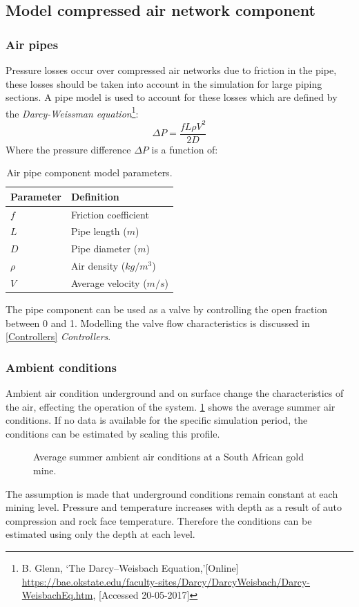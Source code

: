 	\subsection{Model compressed air network component}
		\subsubsection{Air pipes}
		Pressure losses occur over compressed air networks due to friction in the pipe, these losses should be taken into account in the simulation for large piping sections. A pipe model is used to account for these losses which are defined by the \textit{Darcy-Weissman equation}\footnote{ B. Glenn, \enquote*{The Darcy–Weisbach Equation,}[Online] \url{https://bae.okstate.edu/faculty-sites/Darcy/DarcyWeisbach/Darcy-WeisbachEq.htm}, [Accessed 20-05-2017]}:
		$$\Delta P = \frac{f  L \rho V^2}{2 D}$$
		Where the pressure difference $\Delta P $ is a function of:\\
		\begin{table}[h]
			\centering
			\begin{tabular}{ll}
				\hline
				Parameter & Definition\\
				\hline
				$f$ & Friction coefficient  \\
				$L$ & Pipe length ($m$) \\
				$D$ & Pipe diameter ($m$) \\
				$\rho$ & Air density ($kg/m^3$)\\	
				$V$ & Average velocity ($m/s$) \\	
				\hline
			\end{tabular} 
		\caption{Air pipe component model parameters.}
		\label{table: Darcy-Weisbach}
		\end{table}
		
		The pipe component can be used as a valve by controlling the open fraction between 0 and 1. Modelling the valve flow characteristics is discussed in \cref{Controllers} \textit{Controllers}.
		\subsubsection{Ambient conditions}
		Ambient air condition underground and on surface change the characteristics of the air, effecting the operation of the system. \cref{fig: Ambient} shows the average summer air conditions. If no data is available for the specific simulation period, the conditions can be estimated by scaling this profile. 
		\begin{figure}[h]
			\centering
			\fbox{}
			\caption{Average summer ambient air conditions at a South African gold mine.}
			\label{fig: Ambient}
		\end{figure}
		The assumption is made that underground conditions remain constant at each mining level. Pressure and temperature increases with depth as a result of auto compression and rock face temperature. Therefore the conditions can be estimated using only the depth at each level.   
